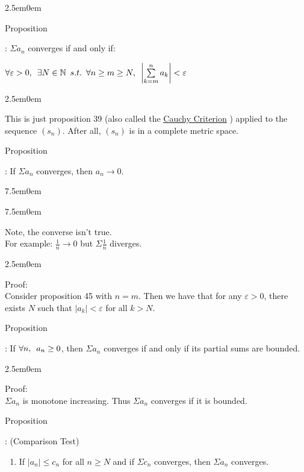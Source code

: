 \documentclass{book}
\newcommand{\hTwo}{%
   \color{MidnightBlue}%
   \fontsize{13}{15}\selectfont%
}
\newcommand{\hThree}{%
   \color{PineGreen}
   \fontsize{13}{15}\selectfont%
}
\newcommand{\teachComment}{
   \color{Orange}%
   \fontsize{12}{14}\selectfont%
}
\newenvironment{myIndent}{%
   \begin{adjustwidth}{2.5em}{0em}%
}{%
   \end{adjustwidth}%
}
\newenvironment{myTindent}{%
   \begin{adjustwidth}{7.5em}{0em}%
}{%
   \end{adjustwidth}%
}
\newcommand{\udefine}[1]{%
   \setulcolor{Red}%
   \setul{0.14em}{0.07em}%
   \ul{#1}%
}
\newcommand{\retTwo}{\hfill\bigbreak}
\newcommand{\suchthat}{ \hspace{0.5em}s.t.\hspace{0.5em}}
\newcommand{\myHS}{ \hspace{0.5em}}
\newcounter{PropNumber}
\newcommand{\propCount}[1][1]{%
   \addtocounter{PropNumber}{#1}%
   \thePropNumber%
}
\begin{document}
      {\begin{myIndent}\hTwo
         Proposition \propCount: $\Sigma a_n$ converges if and only if: 
         
         {\centering $\forall \varepsilon > 0, \myHS \exists N \in \mathbb{N} \suchthat \forall n \geq m \geq N, \myHS \left|\sum\limits_{k=m}^n{a_k}\right| < \varepsilon$ \par}
         
         {\begin{myIndent} \hThree
            This is just proposition 39 (also called the \udefine{Cauchy Criterion}) applied to the sequence $(s_n)$. After all, $(s_n)$ is in a complete metric space.
         \end{myIndent}}

         \newpage

         Proposition \propCount: If $\Sigma a_n$ converges, then $a_n \rightarrow 0$.
         {\begin{myTindent}\begin{myTindent} \teachComment
            Note, the converse isn't true.\\ For example: $\frac{1}{n} \rightarrow 0$ but $\Sigma \frac{1}{n}$ diverges.
         \end{myTindent}\end{myTindent}}

         {\begin{myIndent}\hThree
            Proof:\\
            Consider proposition 45 with $n = m$. Then we have that for any $\varepsilon > 0$, there exists $N$ such that $|a_k| < \varepsilon$ for all $k > N$. \retTwo
         \end{myIndent}}

         Proposition \propCount: If $\forall n, \myHS a_n \geq 0$, then $\Sigma a_n$ converges if and only if its partial sums are bounded.
         {\begin{myIndent}\hThree
            Proof:\\
            $\Sigma a_n$ is monotone increasing. Thus $\Sigma a_n$ converges if it is bounded. \retTwo
         \end{myIndent}}
         
         Proposition \propCount: (Comparison Test)
         \begin{enumerate}
            \item If $|a_n| \leq c_n$ for all $n \geq N$ and if $\Sigma c_n$ converges, then $\Sigma a_n$ converges.


\end{enumerate}
\end{myIndent}}
\end{document}
